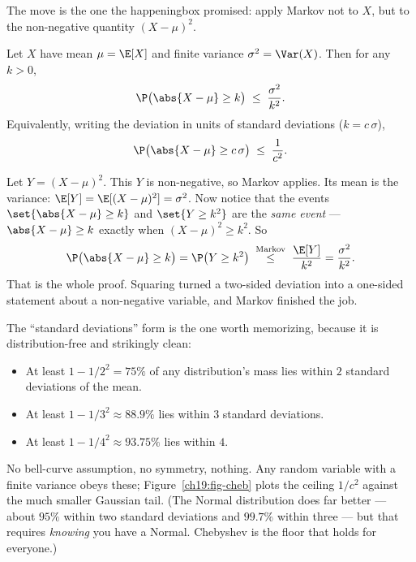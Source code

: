 The move is the one the happeningbox promised: apply Markov not to $X$, but to
the non-negative quantity $(X-\mu)^2$.

\begin{theorem}
\label{ch19:cheb-thm}
Let $X$ have mean $\mu = \E[X]$ and finite variance $\sigma^2 = \Var(X)$. Then
for any $k > 0$,
\[
  \P\bigl(\abs{X-\mu} \ge k\bigr) \;\le\; \frac{\sigma^2}{k^2}.
\]
Equivalently, writing the deviation in units of standard deviations
($k = c\,\sigma$),
\[
  \P\bigl(\abs{X-\mu} \ge c\,\sigma\bigr) \;\le\; \frac{1}{c^2}.
\]
\end{theorem}

\begin{whybox}
Let $Y = (X-\mu)^2$. This $Y$ is non-negative, so Markov applies. Its mean is
the variance: $\E[Y] = \E[(X-\mu)^2] = \sigma^2$. Now notice that the events
$\set{\abs{X-\mu}\ge k}$ and $\set{Y \ge k^2}$ are the \emph{same event} ---
$\abs{X-\mu}\ge k$ exactly when $(X-\mu)^2 \ge k^2$. So
\[
  \P\bigl(\abs{X-\mu}\ge k\bigr)
  = \P\bigl(Y \ge k^2\bigr)
  \;\overset{\text{Markov}}{\le}\;
  \frac{\E[Y]}{k^2}
  = \frac{\sigma^2}{k^2}.
\]
That is the whole proof. Squaring turned a two-sided deviation into a
one-sided statement about a non-negative variable, and Markov finished the
job.
\end{whybox}

The ``standard deviations'' form is the one worth memorizing, because it is
distribution-free and strikingly clean:

\begin{itemize}
  \item At least $1 - 1/2^2 = 75\%$ of any distribution's mass lies within
        $2$ standard deviations of the mean.
  \item At least $1 - 1/3^2 \approx 88.9\%$ lies within $3$ standard
        deviations.
  \item At least $1 - 1/4^2 \approx 93.75\%$ lies within $4$.
\end{itemize}

No bell-curve assumption, no symmetry, nothing. Any random variable with a
finite variance obeys these; Figure~\ref{ch19:fig-cheb} plots the ceiling
$1/c^2$ against the much smaller Gaussian tail. (The Normal distribution does far better ---
about $95\%$ within two standard deviations and $99.7\%$ within three --- but
that requires \emph{knowing} you have a Normal. Chebyshev is the floor that
holds for everyone.)

